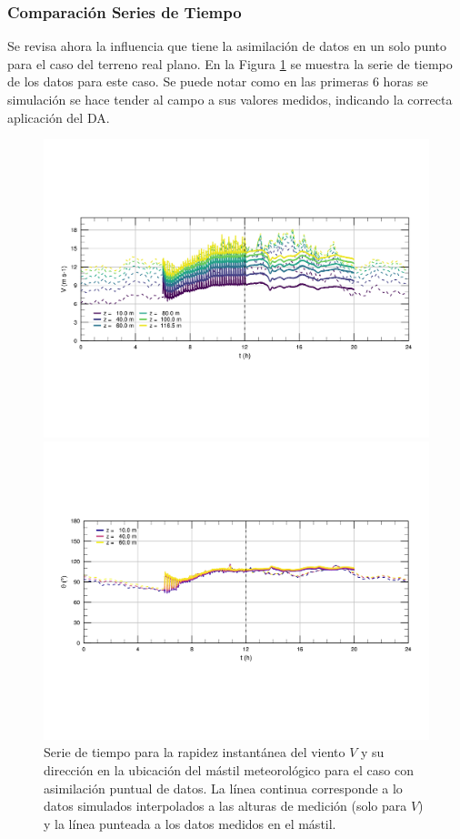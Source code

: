 \subsubsection{Comparación Series de Tiempo}
Se revisa ahora la influencia que tiene la asimilación de datos en un solo punto para el caso del terreno real plano. En la Figura \ref{fig:06_hov_da_ts} se muestra la serie de tiempo de los datos para este caso. Se puede notar como en las primeras 6 horas se simulación se hace tender al campo a sus valores medidos, indicando la correcta aplicación del DA. 
\begin{figure}[H]
	\centering
	\includegraphics[width=1\linewidth,trim={9mm 63mm 10mm 55mm},clip]{Imagenes/06/hov_da/ts_v}%
	
	\includegraphics[width=1\linewidth,trim={12mm 55mm 10mm 55mm},clip]{Imagenes/06/hov_da/ts_o}%
	\caption{Serie de tiempo para la rapidez instantánea del viento $V$ y su dirección en la ubicación del mástil meteorológico para el caso con asimilación puntual de datos. La línea continua corresponde a lo datos simulados interpolados a las alturas de medición (solo para $V$) y la línea punteada a los datos medidos en el mástil.}
	\label{fig:06_hov_da_ts}
\end{figure}
